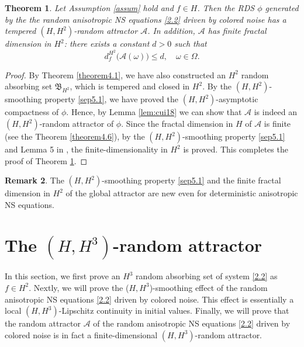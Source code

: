\documentclass{elsarticle}
\newtheorem{theorem}{Theorem}[section]
\theoremstyle{definition}
\newtheorem{remark}[theorem]{Remark}
\numberwithin{equation}{section}
\newcommand{\A}{\mathcal{A}}
\begin{document}
\begin{theorem} \label{theorem5.1}
 Let Assumption \ref{assum} hold and $f\in H$. Then the  RDS $\phi$ generated by the the random anisotropic  NS equations \eqref{2.2} driven by colored noise  has  a tempered $(H,H^2)$-random attractor $\mathcal A $. In addition, $\mathcal A$ has finite fractal dimension in $H^2$: there exists   a constant $ d>0$ such that
\[
d_f^{H^2} \! \big ( \A(\omega) \big)  \leq d, \quad \omega \in \Omega.
\]
\end{theorem}
\begin{proof}
 By Theorem \ref{theorem4.1},  we have also constructed an $H^2$ random absorbing set $\mathfrak B_{H^2}$, which is tempered and closed in $H^2$.  By the  $(H,H^2)$-smoothing property \eqref{sep5.1},   we have proved the $(H,H^2)$-asymptotic compactness of $\phi$. Hence,  by Lemma \ref{lem:cui18} we can show that $\A$ is indeed an $(H,H^2)$-random attractor of $\phi$.
 Since the fractal dimension in $H$ of  $\A$ is finite  (see the Theorem \ref{theorem4.6}),    by the $(H,H^2)$-smoothing property \eqref{sep5.1}  and Lemma 5 in \cite{cui}, the   finite-dimensionality  in $H^2$  is proved. This completes the proof of Theorem \ref{theorem5.1}.
\end{proof}

 \begin{remark}
 The $(H,H^2)$-smoothing property \eqref{sep5.1}  and the finite fractal dimension in $H^2$ of the global attractor    are new even for     deterministic  anisotropic  NS equations.
 \end{remark}

\section{The $(H,H^3)$-random attractor}\label{sec7}
In this section, we first prove an  $H^3$ random absorbing set of system  \eqref{2.2} as $f\in H^2$. Nextly, we will prove the ($H,H^3$)-smoothing effect  of the random anisotropic  NS equations \eqref{2.2} driven by colored noise. This effect  is essentially a local $(H, H^3)$-Lipschitz continuity in initial values. Finally,   we will prove that the  random attractor  $\mathcal A$ of the random anisotropic  NS equations \eqref{2.2} driven by colored noise is in fact a finite-dimensional  $(H,H^3)$-random attractor.
\end{document}
